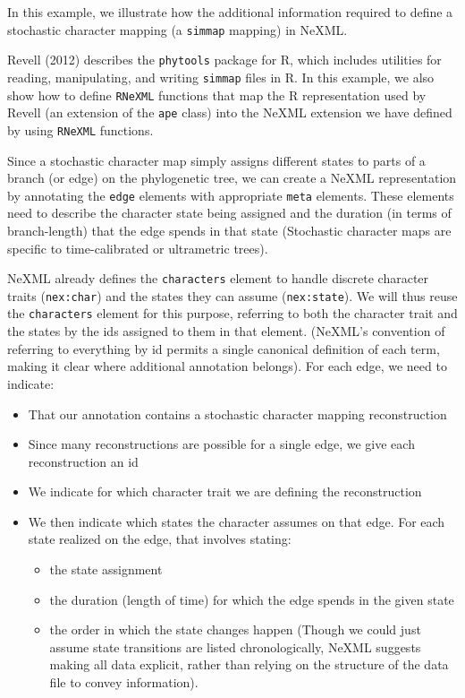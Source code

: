 \documentclass[author-year, review, 11pt]{components/elsarticle} %
\begin{document}
In this example, we illustrate how the additional information required
to define a stochastic character mapping (a \texttt{simmap} mapping) in
NeXML.

Revell (2012) describes the \texttt{phytools} package for R, which
includes utilities for reading, manipulating, and writing
\texttt{simmap} files in R. In this example, we also show how to define
\texttt{RNeXML} functions that map the R representation used by Revell
(an extension of the \texttt{ape} class) into the NeXML extension we
have defined by using \texttt{RNeXML} functions.

Since a stochastic character map simply assigns different states to
parts of a branch (or edge) on the phylogenetic tree, we can create a
NeXML representation by annotating the \texttt{edge} elements with
appropriate \texttt{meta} elements. These elements need to describe the
character state being assigned and the duration (in terms of
branch-length) that the edge spends in that state (Stochastic character
maps are specific to time-calibrated or ultrametric trees).

NeXML already defines the \texttt{characters} element to handle discrete
character traits (\texttt{nex:char}) and the states they can assume
(\texttt{nex:state}). We will thus reuse the \texttt{characters} element
for this purpose, referring to both the character trait and the states
by the ids assigned to them in that element. (NeXML's convention of
referring to everything by id permits a single canonical definition of
each term, making it clear where additional annotation belongs). For
each edge, we need to indicate:

\begin{itemize}
\itemsep1pt\parskip0pt
\item
  That our annotation contains a stochastic character mapping
  reconstruction
\item
  Since many reconstructions are possible for a single edge, we give
  each reconstruction an id
\item
  We indicate for which character trait we are defining the
  reconstruction
\item
  We then indicate which states the character assumes on that edge. For
  each state realized on the edge, that involves stating:

  \begin{itemize}
  \itemsep1pt\parskip0pt
  \item
    the state assignment
  \item
    the duration (length of time) for which the edge spends in the given
    state
  \item
    the order in which the state changes happen (Though we could just
    assume state transitions are listed chronologically, NeXML suggests
    making all data explicit, rather than relying on the structure of
    the data file to convey information).
  \end{itemize}
\end{itemize}
\end{document}
